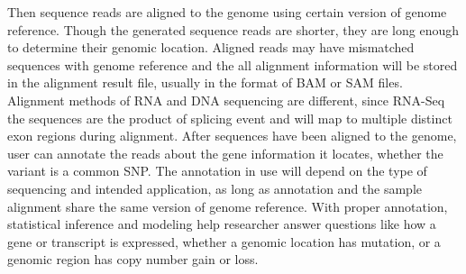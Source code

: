 Then sequence reads are aligned to the genome using certain version of genome
reference. Though the generated sequence reads are shorter, they are long
enough to determine their genomic location. Aligned reads may have mismatched
sequences with genome reference and the all alignment information will be
stored in the alignment result file, usually in the format of BAM or SAM files.
Alignment methods of RNA and DNA sequencing are different, since RNA-Seq the
sequences are the product of splicing event and will map to multiple distinct
exon regions during alignment. After sequences have been aligned to the genome,
user can annotate the reads about the gene information it locates, whether the
variant is a common SNP. The annotation in use will depend on the type of
sequencing and intended application, as long as annotation and the sample
alignment share the same version of genome reference. With proper annotation,
statistical inference and modeling help researcher answer questions like how a
gene or transcript is expressed, whether a genomic location has mutation, or a
genomic region has copy number gain or loss.


%


